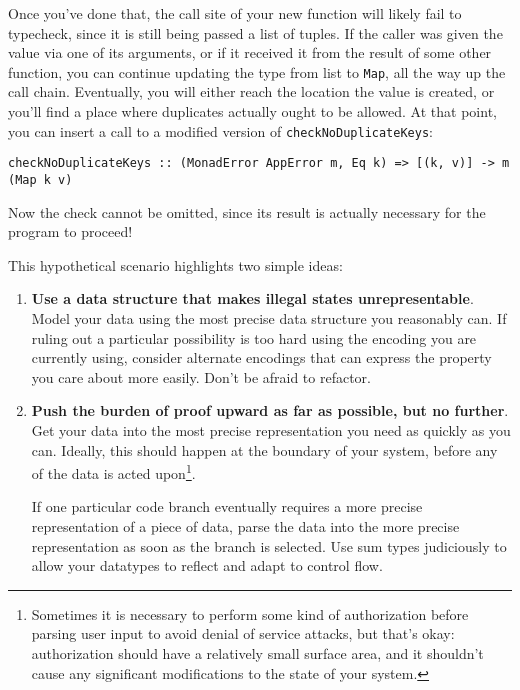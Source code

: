 Once you've done that, the call site of your new function will likely fail to typecheck, since it is still being passed a list of tuples. If the caller was given the value via one of its arguments, or if it received it from the result of some other function, you can continue updating the type from list to \texttt{Map}, all the way up the call chain. Eventually, you will either reach the location the value is created, or you'll find a place where duplicates actually ought to be allowed. At that point, you can insert a call to a modified version of \texttt{checkNoDuplicateKeys}:

\begin{verbatim}
checkNoDuplicateKeys :: (MonadError AppError m, Eq k) => [(k, v)] -> m (Map k v)
\end{verbatim}
Now the check cannot be omitted, since its result is actually necessary for the program to proceed!

This hypothetical scenario highlights two simple ideas:

\begin{enumerate}
\item \textbf{Use a data structure that makes illegal states unrepresentable}. Model your data using the most precise data structure you reasonably can. If ruling out a particular possibility is too hard using the encoding you are currently using, consider alternate encodings that can express the property you care about more easily. Don't be afraid to refactor.

\item \textbf{Push the burden of proof upward as far as possible, but no further}. Get your data into the most precise representation you need as quickly as you can. Ideally, this should happen at the boundary of your system, before any of the data is acted upon\footnote{Sometimes it is necessary to perform some kind of authorization before parsing user input to avoid denial of service attacks, but that's okay: authorization should have a relatively small surface area, and it shouldn't cause any significant modifications to the state of your system.}.

If one particular code branch eventually requires a more precise representation of a piece of data, parse the data into the more precise representation as soon as the branch is selected. Use sum types judiciously to allow your datatypes to reflect and adapt to control flow.                                                                                                                                                                                                                                                                                  \end{enumerate}


